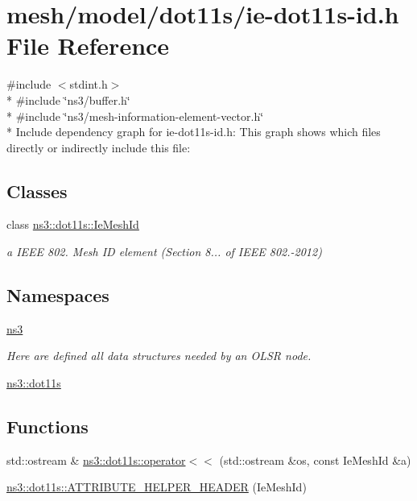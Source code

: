 \hypertarget{ie-dot11s-id_8h}{}\section{mesh/model/dot11s/ie-\/dot11s-\/id.h File Reference}
\label{ie-dot11s-id_8h}
{\ttfamily \#include $<$stdint.\+h$>$}\\*
{\ttfamily \#include \char`\"{}ns3/buffer.\+h\char`\"{}}\\*
{\ttfamily \#include \char`\"{}ns3/mesh-\/information-\/element-\/vector.\+h\char`\"{}}\\*
Include dependency graph for ie-\/dot11s-\/id.h\+:
This graph shows which files directly or indirectly include this file\+:
\subsection*{Classes}
\begin{DoxyCompactItemize}
\item 
class \hyperlink{classns3_1_1dot11s_1_1IeMeshId}{ns3\+::dot11s\+::\+Ie\+Mesh\+Id}
\begin{DoxyCompactList}\small\item\em a I\+E\+EE 802. Mesh ID element (Section 8... of I\+E\+EE 802.-\/2012) \end{DoxyCompactList}\end{DoxyCompactItemize}
\subsection*{Namespaces}
\begin{DoxyCompactItemize}
\item 
 \hyperlink{namespacens3}{ns3}
\begin{DoxyCompactList}\small\item\em Here are defined all data structures needed by an O\+L\+SR node. \end{DoxyCompactList}\item 
 \hyperlink{namespacens3_1_1dot11s}{ns3\+::dot11s}
\end{DoxyCompactItemize}
\subsection*{Functions}
\begin{DoxyCompactItemize}
\item 
std\+::ostream \& \hyperlink{namespacens3_1_1dot11s_a105b67e6a433a9b868bd7886afc8b8ee}{ns3\+::dot11s\+::operator$<$$<$} (std\+::ostream \&os, const Ie\+Mesh\+Id \&a)
\item 
\hyperlink{namespacens3_1_1dot11s_a1bc0beac2c6dcfdcc01314c184deaec9}{ns3\+::dot11s\+::\+A\+T\+T\+R\+I\+B\+U\+T\+E\+\_\+\+H\+E\+L\+P\+E\+R\+\_\+\+H\+E\+A\+D\+ER} (Ie\+Mesh\+Id)
\end{DoxyCompactItemize}
